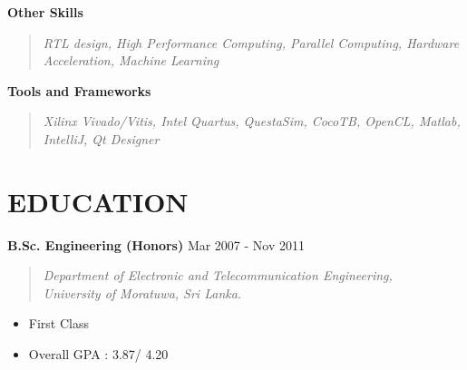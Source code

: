 \documentclass[mm]{res} %
\begin{document}
\begin{resume}
\textbf{Other Skills}
\begin{quote}
	\emph{RTL design, High Performance Computing, Parallel Computing, Hardware Acceleration, Machine Learning}
\end{quote}

\textbf{Tools and Frameworks}
\begin{quote}
	\emph{Xilinx Vivado/Vitis, Intel Quartus, QuestaSim, CocoTB, OpenCL, Matlab, IntelliJ, Qt Designer}
	\end{quote}





\section{EDUCATION}


\textbf{B.Sc. Engineering (Honors)} \hfill Mar 2007 - Nov 2011
\begin{quote}
\emph{Department of Electronic and Telecommunication Engineering, \\
University of Moratuwa, Sri Lanka.}
\end{quote}

\begin{itemize} \itemsep -1pt %
\item First Class
\item Overall GPA : 3.87/ 4.20
\end{itemize}


\end{resume}
\end{document}
